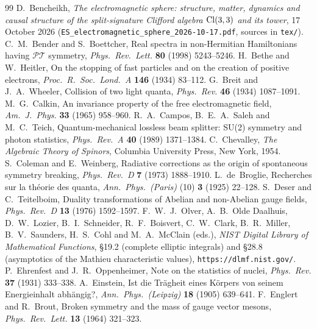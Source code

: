 \begin{thebibliography}{99}
 D.~Bencheikh, \emph{The electromagnetic sphere: structure, matter, dynamics and causal structure of the split-signature
Clifford algebra $\mathrm{Cl}(3,3)$ and its tower}, 17 October 2026 (\texttt{ES\_electromagnetic\_sphere\_2026-10-17.pdf}, sources in \texttt{tex/}).
 C.~M.~Bender and S.~Boettcher, Real spectra in non-Hermitian Hamiltonians having $\mathcal{PT}$ symmetry, \emph{Phys.\ Rev.\ Lett.} \textbf{80} (1998) 5243--5246.
 H.~Bethe and W.~Heitler, On the stopping of fast particles and on the creation of positive electrons, \emph{Proc.\ R.\ Soc.\ Lond.\ A} \textbf{146} (1934) 83--112.
 G.~Breit and J.~A.~Wheeler, Collision of two light quanta, \emph{Phys.\ Rev.} \textbf{46} (1934) 1087--1091.
 M.~G.~Calkin, An invariance property of the free electromagnetic field, \emph{Am.\ J.\ Phys.} \textbf{33} (1965) 958--960.
 R.~A.~Campos, B.~E.~A.~Saleh and M.~C.~Teich, Quantum-mechanical lossless beam splitter: SU(2) symmetry and photon statistics, \emph{Phys.\ Rev.\ A} \textbf{40} (1989) 1371--1384.
 C.~Chevalley, \emph{The Algebraic Theory of Spinors}, Columbia University Press, New York, 1954.
 S.~Coleman and E.~Weinberg, Radiative corrections as the origin of spontaneous symmetry breaking, \emph{Phys.\ Rev.\ D} \textbf{7} (1973) 1888--1910.
 L.~de~Broglie, Recherches sur la th\'eorie des quanta, \emph{Ann.\ Phys.\ (Paris)} (10) \textbf{3} (1925) 22--128.
 S.~Deser and C.~Teitelboim, Duality transformations of Abelian and non-Abelian gauge fields, \emph{Phys.\ Rev.\ D} \textbf{13} (1976) 1592--1597.
 F.~W.~J.~Olver, A.~B.~Olde Daalhuis, D.~W.~Lozier, B.~I.~Schneider, R.~F.~Boisvert, C.~W.~Clark, B.~R.~Miller, B.~V.~Saunders, H.~S.~Cohl and M.~A.~McClain (eds.), \emph{NIST Digital Library of Mathematical Functions}, \S19.2 (complete elliptic integrals) and \S28.8 (asymptotics of the Mathieu characteristic values), \texttt{https://dlmf.nist.gov/}.
 P.~Ehrenfest and J.~R.~Oppenheimer, Note on the statistics of nuclei, \emph{Phys.\ Rev.} \textbf{37} (1931) 333--338.
 A.~Einstein, Ist die Tr\"agheit eines K\"orpers von seinem Energieinhalt abh\"angig?, \emph{Ann.\ Phys.\ (Leipzig)} \textbf{18} (1905) 639--641.
 F.~Englert and R.~Brout, Broken symmetry and the mass of gauge vector mesons, \emph{Phys.\ Rev.\ Lett.} \textbf{13} (1964) 321--323.

\end{thebibliography}
